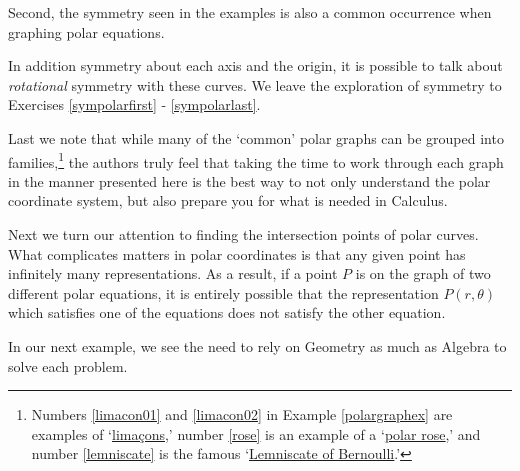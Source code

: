 \documentclass{ximera}
\begin{document}
\smallskip

Second, the symmetry seen in the examples is also a common occurrence when graphing polar equations.  

\smallskip

In addition symmetry about each axis and the origin, it is possible to talk about \textit{rotational} symmetry with these curves.  We leave the exploration of symmetry to Exercises \ref{sympolarfirst} - \ref{sympolarlast}. 

\smallskip

Last we note that while many of the    `common' polar graphs can be grouped into families,\footnote{Numbers \ref{limacon01} and \ref{limacon02} in Example \ref{polargraphex} are examples of `\href{http://en.wikipedia.org/wiki/Limacon}{\underline{lima\c{c}ons}},' number \ref{rose} is an example of a `\href{http://en.wikipedia.org/wiki/Rose_(mathematics)}{\underline{polar rose}},' and number \ref{lemniscate} is the famous `\href{http://en.wikipedia.org/wiki/Lemniscate_of_Bernoulli}{\underline{Lemniscate of Bernoulli}}.'} the authors truly feel that taking the time to work through each graph in the manner presented here is the best way to not only understand the polar coordinate system, but also prepare you for what is needed in Calculus.  

\smallskip

 Next we turn our attention to finding the intersection points of polar curves.  What complicates matters in polar coordinates is that any given point has infinitely many representations.  As a result, if a point $P$ is on the graph of two different polar equations, it is entirely possible that the representation $P(r,\theta)$ which satisfies one of the equations does not satisfy the other equation.
 
 \smallskip
 
In our next example, we see the need to rely on Geometry as much as Algebra to solve each problem.

\smallskip
\end{document}
